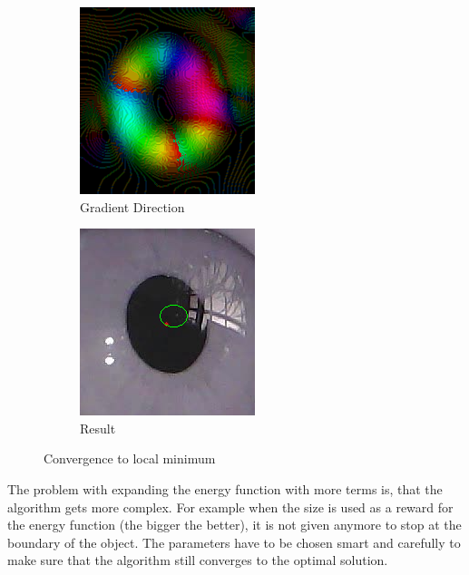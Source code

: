 \begin{figure}[h]
\begin{subfigure}{0.5\textwidth}
        \includegraphics[width=0.7\linewidth]{plots/eye_dataset/direction.png}
        \caption{Gradient Direction}
    \end{subfigure}%
    \hfill
    \begin{subfigure}{0.5\textwidth}
        \centering
        \includegraphics[width=0.7\linewidth]{plots/eye_dataset/result.png}
        \caption{Result}
    \end{subfigure}
    \caption{Convergence to local minimum}
    \label{fig:ac_ellipse_gradient}
\end{figure}
The problem with expanding the energy function with more terms is, that the algorithm gets more complex. For example when the size is used as a reward for the energy function (the bigger the better), it is not given anymore to stop at the boundary of the object. The parameters have to be chosen smart and carefully to make sure that the algorithm still converges to the optimal solution. 

